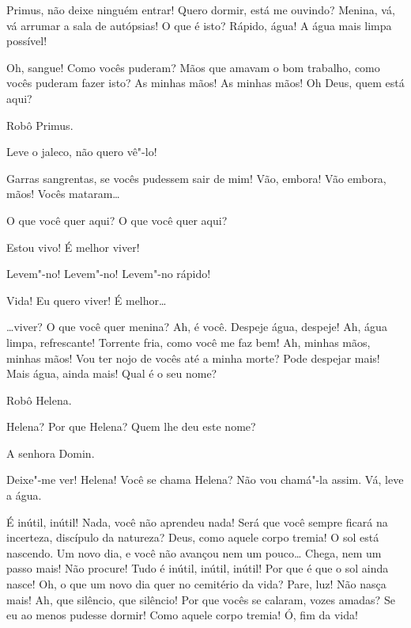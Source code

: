  Primus, não deixe ninguém entrar! Quero dormir, está me ouvindo?
Menina, vá, vá arrumar a sala de autópsias! O que é isto?  Rápido, água! A água mais limpa possível!

 Oh, sangue! Como vocês puderam? Mãos que amavam o bom trabalho,
como vocês puderam fazer isto? As minhas mãos! As minhas mãos! Oh Deus, quem
está aqui?

 Robô Primus.

 Leve o jaleco, não quero vê"-lo!

 Garras sangrentas, se vocês pudessem sair de mim! Vão, embora! Vão
embora, mãos! Vocês mataram\ldots{}

  O que você quer aqui? O que você quer aqui?

 Estou vivo! É melhor viver!

 Levem"-no! Levem"-no! Levem"-no rápido!

  Vida! Eu quero viver! É melhor\ldots{}

 \ldots{}viver? O que você quer menina? Ah, é você. Despeje água, despeje!
 Ah, água limpa, refrescante! Torrente fria, como você me faz bem!
Ah, minhas mãos, minhas mãos! Vou ter nojo de vocês até a minha morte? Pode
despejar mais! Mais água, ainda mais! Qual é o seu nome?

 Robô Helena.

 Helena? Por que Helena? Quem lhe deu este nome?

 A senhora Domin.

 Deixe"-me ver! Helena! Você se chama Helena? Não vou chamá"-la assim.
Vá, leve a água.

  É inútil, inútil! Nada, você não aprendeu nada! 
Será que você sempre ficará na incerteza, discípulo da natureza?
Deus, como aquele corpo tremia!  O sol
está nascendo. Um novo dia, e você não avançou nem um pouco\ldots{} Chega, nem um
passo mais! Não procure! Tudo é inútil, inútil, inútil! Por que é que o sol
ainda nasce! Oh, o que um novo dia quer no cemitério da vida? Pare, luz! Não
nasça mais! Ah, que silêncio, que silêncio! Por que vocês se calaram, vozes
amadas? Se eu ao menos pudesse dormir!  Como aquele corpo tremia! Ó, fim da vida!

